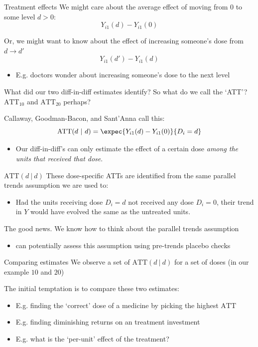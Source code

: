 \documentclass[aspectratio=169,t]{beamer}
\begin{document}
\begin{frame}{Treatment effects}
  We might care about the average effect of moving from 0 to some level $d > 0$:
  $$
    Y_{i1}(d) - Y_{i1}(0)
  $$

  \bigskip
  Or, we might want to know about the effect of increasing someone's dose from $d \to d'$
  $$
    Y_{i1}(d') - Y_{i1}(d)
  $$

  \begin{itemize}
    \item E.g. doctors wonder about increasing someone's dose to the next level
  \end{itemize}
\end{frame}

\begin{frame}{What did our two diff-in-diff estimates identify?}
  So what do we call the `ATT'? $\text{ATT}_{10}$ and $\text{ATT}_{20}$ perhaps?

  \bigskip\bigskip
  Callaway, Goodman-Bacon, and Sant'Anna call this:
  $$
    \text{ATT}(d \ \vert \ d) = \expec{Y_{i1}(d) - Y_{i1}(0)}{D_i = d}
  $$

  \begin{itemize}
    \item Our diff-in-diff's can only estimate the effect of a certain dose \emph{among the units that received that dose}.
  \end{itemize}
\end{frame}

\begin{frame}{$\text{ATT}(d \ \vert \ d)$}
  These dose-specific ATTs are identified from the same parallel trends assumption we are used to:
  \begin{itemize}
    \item Had the units receiving dose $D_i = d$ not received any dose $D_i = 0$, their trend in $Y$ would have evolved the same as the untreated units.
  \end{itemize}

  \bigskip
  The good news. We know how to think about the parallel trends assumption
  \begin{itemize}
    \item can potentially assess this assumption using pre-trends placebo checks
  \end{itemize}
\end{frame}

\begin{frame}{Comparing estimates}
  We observe a set of $\text{ATT}(d \ | \ d)$ for a set of doses (in our example $10$ and $20$)

  \bigskip
  The initial temptation is to compare these two estimates:
  \begin{itemize}
    \item E.g. finding the `correct' dose of a medicine by picking the highest $\text{ATT}$

    \item E.g. finding diminishing returns on an treatment investment

    \item E.g. what is the `per-unit' effect of the treatment?
  \end{itemize}
\end{frame}
\end{document}
